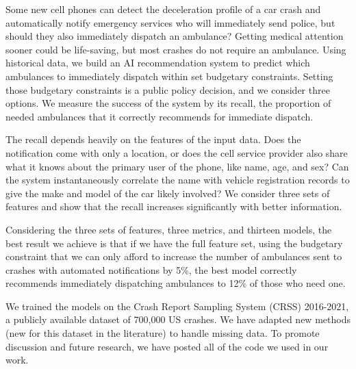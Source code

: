 Some new cell phones can detect the deceleration profile of a car crash and automatically notify emergency services who will immediately send police, but should they also immediately dispatch an ambulance?  Getting medical attention sooner could be life-saving, but most crashes do not require an ambulance.  Using historical data, we build an AI recommendation system to predict which ambulances to immediately dispatch within set budgetary constraints.  Setting those budgetary constraints is a public policy decision, and we consider three options.  We measure the success of the system by its recall, the proportion of needed ambulances that it correctly recommends for immediate dispatch.

The recall depends heavily on the features of the input data.  Does the notification come with only a location, or does the cell service provider also share what it knows about the primary user of the phone, like name, age, and sex?  Can the system instantaneously correlate the name with vehicle registration records to give the make and model of the car likely involved?   We consider three sets of features and show that the recall increases significantly with better information.  

Considering the three sets of features, three metrics, and thirteen models, the best result we achieve is that if we have the full feature set, using the budgetary constraint that we can only afford to increase the number of ambulances sent to crashes with automated notifications by 5\%, the best model correctly recommends immediately dispatching ambulances to 12\% of those who need one.  

We trained the models on the Crash Report Sampling System (CRSS) 2016-2021, a publicly available dataset of 700,000 US crashes.  We have adapted new methods (new for this dataset in the literature) to handle missing data.  To promote discussion and future research, we have posted all of the code we used in our work.
